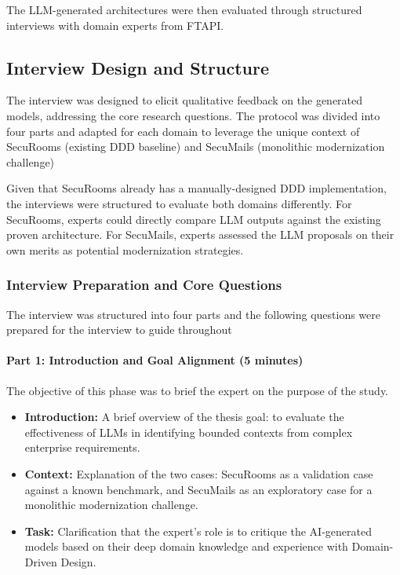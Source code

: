 The LLM-generated architectures were then evaluated through structured interviews with domain experts from FTAPI.

\subsection{Interview Design and Structure}
The interview was designed to elicit qualitative feedback on the generated models, addressing the core research questions. The protocol was divided into four parts and adapted for each domain to leverage the unique context of SecuRooms (existing DDD baseline) and SecuMails (monolithic modernization challenge)

Given that SecuRooms already has a manually-designed DDD implementation, the interviews were structured to evaluate both domains differently. For SecuRooms, experts could directly compare LLM outputs against the existing proven architecture. For SecuMails, experts assessed the LLM proposals on their own merits as potential modernization strategies.

\subsubsection{Interview Preparation and Core Questions}
\label{sec:interview_phases}

The interview was structured into four parts and the following questions were prepared for the interview to guide throughout

\paragraph{Part 1: Introduction and Goal Alignment (5 minutes)}
The objective of this phase was to brief the expert on the purpose of the study.
\begin{itemize}
    \item \textbf{Introduction:} A brief overview of the thesis goal: to evaluate the effectiveness of LLMs in identifying bounded contexts from complex enterprise requirements.
    \item \textbf{Context:} Explanation of the two cases: SecuRooms as a validation case against a known benchmark, and SecuMails as an exploratory case for a monolithic modernization challenge.
    \item \textbf{Task:} Clarification that the expert's role is to critique the AI-generated models based on their deep domain knowledge and experience with Domain-Driven Design.
\end{itemize}

